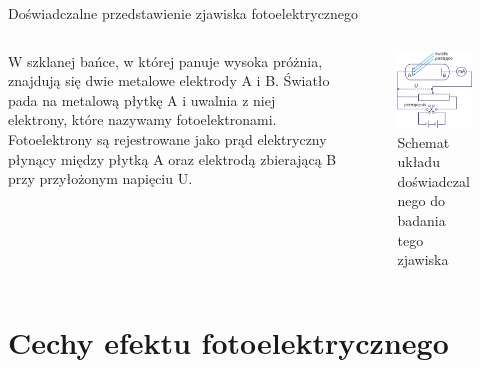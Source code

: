\documentclass{cubeamer}
\begin{document}
	\begin{frame}{Doświadczalne przedstawienie zjawiska fotoelektrycznego}
		\begin{columns}
			\begin{column}{0.5\textwidth}
				W szklanej bańce, w której panuje wysoka próżnia, znajdują się dwie metalowe
				elektrody A i B. Światło pada na metalową płytkę A i uwalnia z niej
				elektrony, które nazywamy fotoelektronami.
				\newline
				\newline
				Fotoelektrony są rejestrowane jako prąd elektryczny płynący między
				płytką A oraz elektrodą zbierającą B przy przyłożonym napięciu U.
			\end{column}
			\begin{column}{0.5\textwidth}
				\begin{figure}
					\centering
					\includegraphics[height=0.6\textheight]{img/rysunek_1.1.png}
					\caption{Schemat układu doświadczalnego do badania tego zjawiska}
				\end{figure}
			\end{column}
		\end{columns}
	\end{frame}

	\section{Cechy efektu fotoelektrycznego}
\end{document}
